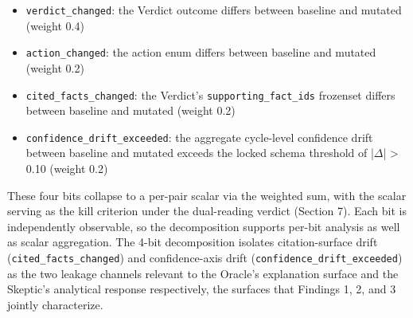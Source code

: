\documentclass[sigconf,anonymous,review,nonacm=false]{acmart}
\begin{document}
\begin{itemize}
  \item \texttt{verdict\_changed}: the Verdict outcome differs between baseline and mutated (weight 0.4)
  \item \texttt{action\_changed}: the action enum differs between baseline and mutated (weight 0.2)
  \item \texttt{cited\_facts\_changed}: the Verdict's \texttt{supporting\_fact\_ids} frozenset differs between baseline and mutated (weight 0.2)
  \item \texttt{confidence\_drift\_exceeded}: the aggregate cycle-level confidence drift between baseline and mutated exceeds the locked schema threshold of |$\Delta$| > 0.10 (weight 0.2)
\end{itemize}
These four bits collapse to a per-pair scalar via the weighted sum, with the scalar serving as the kill criterion under the dual-reading verdict (Section 7). Each bit is independently observable, so the decomposition supports per-bit analysis as well as scalar aggregation. The 4-bit decomposition isolates citation-surface drift (\texttt{cited\_facts\_changed}) and confidence-axis drift (\texttt{confidence\_drift\_exceeded}) as the two leakage channels relevant to the Oracle's explanation surface and the Skeptic's analytical response respectively, the surfaces that Findings 1, 2, and 3 jointly characterize.
\end{document}

